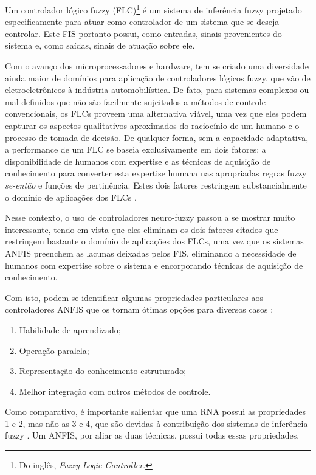 Um controlador lógico fuzzy (FLC)\footnote{Do inglês, \textit{Fuzzy Logic Controller}.} é um sistema de inferência fuzzy projetado especificamente para atuar como controlador de um sistema que se deseja controlar. Este FIS portanto possui, como entradas, sinais provenientes do sistema e, como saídas, sinais de atuação sobre ele.

Com o avanço dos microprocessadores e hardware, tem se criado uma diversidade ainda maior de domínios para aplicação de controladores lógicos fuzzy, que vão de eletroeletrônicos à indústria automobilística. De fato, para sistemas complexos ou mal definidos que não são facilmente sujeitados a métodos de controle convencionais, os FLCs proveem uma alternativa viável, uma vez que eles podem capturar os aspectos qualitativos aproximados do raciocínio de um humano e o processo de tomada de decisão. De qualquer forma, sem a capacidade adaptativa, a performance de um FLC se baseia exclusivamente em dois fatores: a disponibilidade de humanos com expertise e as técnicas de aquisição de conhecimento para converter esta expertise humana nas apropriadas regras fuzzy \textit{se-então} e funções de pertinência. Estes dois fatores restringem substancialmente o domínio de aplicações dos FLCs \cite[p.~451]{Jang1997}.

Nesse contexto, o uso de controladores neuro-fuzzy passou a se mostrar muito interessante, tendo em vista que eles eliminam os dois fatores citados que restringem bastante o domínio de aplicações dos FLCs, uma vez que os sistemas ANFIS preenchem as lacunas deixadas pelos FIS, eliminando a necessidade de humanos com expertise sobre o sistema e encorporando técnicas de aquisição de conhecimento.

Com isto, podem-se identificar algumas propriedades particulares aos controladores ANFIS que os tornam ótimas opções para diversos casos \cite[p.~458]{Jang1997}:
\begin{enumerate}
  \item Habilidade de aprendizado;
  \item Operação paralela;
  \item Representação do conhecimento estruturado;
  \item Melhor integração com outros métodos de controle.
\end{enumerate}

Como comparativo, é importante salientar que uma RNA possui as propriedades 1 e 2, mas não as 3 e 4, que são devidas à contribuição dos sistemas de inferência fuzzy \cite[p.~458]{Jang1997}. Um ANFIS, por aliar as duas técnicas, possui todas essas propriedades.

